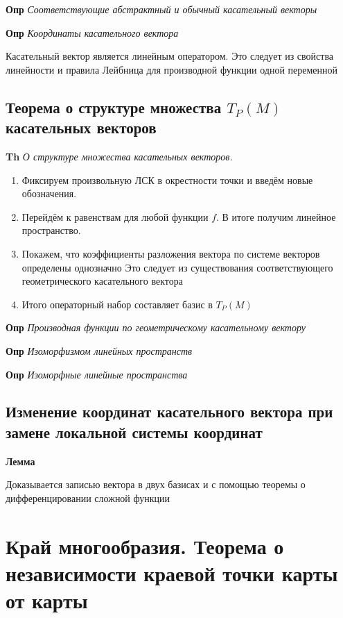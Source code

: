 \documentclass[a4paper, 14pt]{article}
\begin{document}
    \textbf{Опр} \textit{Соответствующие абстрактный и обычный касательный векторы}
    
    \textbf{Опр} \textit{Координаты касательного вектора}
    
    Касательный вектор является линейным оператором.
    Это следует из свойства линейности и правила Лейбница для производной функции одной переменной
    
    \subsection{Теорема о структуре множества $T_P (M)$ касательных векторов}
    
    \textbf{Th} \textit{О структуре множества касательных векторов.}
    
    \begin{enumerate}
        \item Фиксируем произвольную ЛСК в окрестности точки и введём новые обозначения.
        \item Перейдём к равенствам для любой функции $f$.
        В итоге получим линейное пространство.
        \item Покажем, что коэффициенты разложения вектора по системе векторов определены однозначно
        Это следует из существования соответствующего геометрического касательного вектора
        \item Итого операторный набор составляет базис в $T_P (M)$
    \end{enumerate}
    
    \textbf{Опр} \textit{Производная функции по геометрическому касательному вектору}
    
    \textbf{Опр} \textit{Изоморфизмом линейных пространств}
    
    \textbf{Опр} \textit{Изоморфные линейные пространства}
    
    \subsection{Изменение координат касательного вектора при замене локальной системы координат}
    
    \textbf{Лемма}
    
    Доказывается записью вектора в двух базисах и с помощью теоремы о дифференцировании сложной функции
    
    \section{Край многообразия.
    Теорема о независимости краевой точки карты от карты}
    
\end{document}
